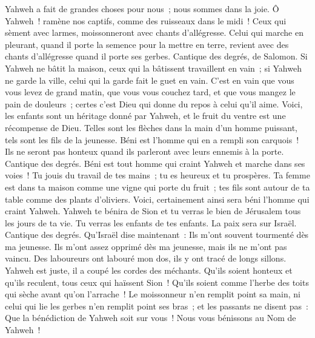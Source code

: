 \begin{multicols}{2}
Yahweh a fait de grandes choses pour nous~; nous sommes dans la joie.
Ô Yahweh~! ramène nos captifs, comme des ruisseaux dans le midi~!
Ceux qui sèment avec larmes, moissonneront avec chants d'allégresse.
Celui qui marche en pleurant, quand il porte la semence pour la mettre en terre, revient avec des chants d'allégresse quand il porte ses gerbes.
\VerseOne{}Cantique des degrés, de Salomon. Si Yahweh ne bâtit la maison, ceux qui la bâtissent travaillent en vain~; si Yahweh ne garde la ville, celui qui la garde fait le guet en vain.
C'est en vain que vous vous levez de grand matin, que vous vous couchez tard, et que vous mangez le pain de douleurs~; certes c'est Dieu qui donne du repos à celui qu'il aime.
Voici, les enfants sont un héritage donné par Yahweh, et le fruit du ventre est une récompense de Dieu.
Telles sont les flèches dans la main d'un homme puissant, tels sont les fils de la jeunesse.
Béni est l'homme qui en a rempli son carquois~! Ils ne seront pas honteux quand ils parleront avec leurs ennemis à la porte.
\VerseOne{}Cantique des degrés. Béni est tout homme qui craint Yahweh et marche dans ses voies~!
Tu jouis du travail de tes mains~; tu es heureux et tu prospères.
Ta femme est dans ta maison comme une vigne qui porte du fruit~; tes fils sont autour de ta table comme des plants d'oliviers.
Voici, certainement ainsi sera béni l'homme qui craint Yahweh.
Yahweh te bénira de Sion et tu verras le bien de Jérusalem tous les jours de ta vie.
Tu verras les enfants de tes enfants. La paix sera sur Israël.
\VerseOne{}Cantique des degrés. Qu'Israël dise maintenant~: Ils m'ont souvent tourmenté dès ma jeunesse.
Ils m'ont assez opprimé dès ma jeunesse, mais ils ne m'ont pas vaincu.
Des laboureurs ont labouré mon dos, ils y ont tracé de longs sillons.
Yahweh est juste, il a coupé les cordes des méchants.
Qu'ils soient honteux et qu'ils reculent, tous ceux qui haïssent Sion~!
Qu'ils soient comme l'herbe des toits qui sèche avant qu'on l'arrache~!
Le moissonneur n'en remplit point sa main, ni celui qui lie les gerbes n'en remplit point ses bras~;
et les passants ne disent pas~: Que la bénédiction de Yahweh soit sur vous~! Nous vous bénissons au Nom de Yahweh~!

\end{multicols}
